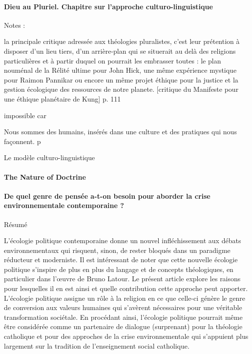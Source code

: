  
    

  




\paragraph{Dieu au Pluriel.  Chapitre sur l'approche culturo-linguistique}    
        \cite{cheno_dieu_2017}

    Notes :
\begin{singlequote}
        
        la principale critique adressée aux théologies pluralistes, c’est leur prétention à disposer d’un lieu tiers, d’un arrière-plan qui se situerait au delà des religions particulières et à partir duquel on pourrait les embrasser toutes : le plan nouménal de la Rélité ultime pour John Hick, une même expérience mystique pour Raimon Pannikar ou encore un même projet éthique pour la justice et la gestion écologique des ressources de notre planete. [critique du Manifeste pour une éthique planétaire de Kung] p. 111
\end{singlequote}

        impossible car
\begin{singlequote}
        Nous sommes des humains, insérés dans une culture et des pratiques qui nous façonnent. p

\end{singlequote}

        Le modèle culturo-linguistique
\paragraph{The Nature of Doctrine} \cite{lindbeck_nature_2002}

    
\paragraph{De quel genre de pensée a-t-on besoin pour aborder la crise environnementale contemporaine ? }
        \cite{howles_quel_2022}
Résumé   	
\begin{singlequote}

L'écologie politique contemporaine donne un nouvel infléchissement aux débats environnementaux qui risquent, sinon, de rester bloqués dans un paradigme réducteur et moderniste. Il est intéressant de noter que cette nouvelle écologie politique s'inspire de plus en plus du langage et de concepts théologiques, en particulier dans l'œuvre de Bruno Latour. Le présent article explore les raisons pour lesquelles il en est ainsi et quelle contribution cette approche peut apporter. L'écologie politique assigne un rôle à la religion en ce que celle-ci génère le genre de conversion aux valeurs humaines qui s'avèrent nécessaires pour une véritable transformation sociétale. En procédant ainsi, l'écologie politique pourrait même être considérée comme un partenaire de dialogue (surprenant) pour la théologie catholique et pour des approches de la crise environnementale qui s'appuient plus largement sur la tradition de l'enseignement social catholique.
\end{singlequote}
 
